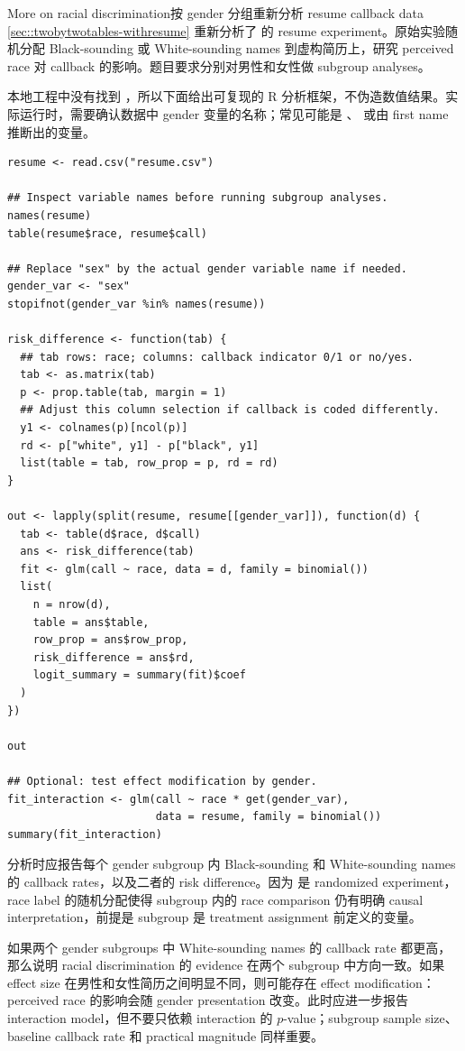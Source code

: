 \begin{exercisesolution}{More on racial discrimination}{按 gender 分组重新分析 resume callback data}
\cref{sec::twobytwotables-withresume} 重新分析了 \citet{bertrand2004emily} 的 resume experiment。原始实验随机分配 Black-sounding 或 White-sounding names 到虚构简历上，研究 perceived race 对 callback 的影响。题目要求分别对男性和女性做 subgroup analyses。

本地工程中没有找到 ，所以下面给出可复现的 R 分析框架，不伪造数值结果。实际运行时，需要确认数据中 gender 变量的名称；常见可能是 、 或由 first name 推断出的变量。

\begin{lstlisting}
resume <- read.csv("resume.csv")

## Inspect variable names before running subgroup analyses.
names(resume)
table(resume$race, resume$call)

## Replace "sex" by the actual gender variable name if needed.
gender_var <- "sex"
stopifnot(gender_var %in% names(resume))

risk_difference <- function(tab) {
  ## tab rows: race; columns: callback indicator 0/1 or no/yes.
  tab <- as.matrix(tab)
  p <- prop.table(tab, margin = 1)
  ## Adjust this column selection if callback is coded differently.
  y1 <- colnames(p)[ncol(p)]
  rd <- p["white", y1] - p["black", y1]
  list(table = tab, row_prop = p, rd = rd)
}

out <- lapply(split(resume, resume[[gender_var]]), function(d) {
  tab <- table(d$race, d$call)
  ans <- risk_difference(tab)
  fit <- glm(call ~ race, data = d, family = binomial())
  list(
    n = nrow(d),
    table = ans$table,
    row_prop = ans$row_prop,
    risk_difference = ans$rd,
    logit_summary = summary(fit)$coef
  )
})

out

## Optional: test effect modification by gender.
fit_interaction <- glm(call ~ race * get(gender_var),
                       data = resume, family = binomial())
summary(fit_interaction)
\end{lstlisting}

分析时应报告每个 gender subgroup 内 Black-sounding 和 White-sounding names 的 callback rates，以及二者的 risk difference。因为 \citet{bertrand2004emily} 是 randomized experiment，race label 的随机分配使得 subgroup 内的 race comparison 仍有明确 causal interpretation，前提是 subgroup 是 treatment assignment 前定义的变量。

如果两个 gender subgroups 中 White-sounding names 的 callback rate 都更高，那么说明 racial discrimination 的 evidence 在两个 subgroup 中方向一致。如果 effect size 在男性和女性简历之间明显不同，则可能存在 effect modification：perceived race 的影响会随 gender presentation 改变。此时应进一步报告 interaction model，但不要只依赖 interaction 的 $p$-value；subgroup sample size、baseline callback rate 和 practical magnitude 同样重要。


\end{exercisesolution}
